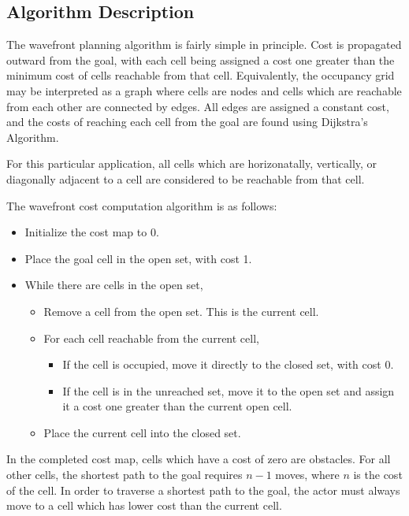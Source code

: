 \documentclass[11pt]{article} %
\begin{document}
\subsection{Algorithm Description}
The wavefront planning algorithm is fairly simple in principle.  Cost is propagated outward from the goal, with each cell being assigned a cost one greater than the minimum cost of cells reachable from that cell.  Equivalently, the occupancy grid may be interpreted as a graph where cells are nodes and cells which are reachable from each other are connected by edges.  All edges are assigned a constant cost, and the costs of reaching each cell from the goal are found using Dijkstra's Algorithm.

For this particular application, all cells which are horizonatally, vertically, or diagonally adjacent to a cell are considered to be reachable from that cell.

The wavefront cost computation algorithm is as follows:

\begin{itemize}
 \item Initialize the cost map to 0.
 \item Place the goal cell in the open set, with cost 1.
 \item While there are cells in the open set, \begin{itemize}
  \item Remove a cell from the open set.  This is the current cell.
  \item For each cell reachable from the current cell, \begin{itemize}
    \item If the cell is occupied, move it directly to the closed set, with cost 0.
    \item If the cell is in the unreached set, move it to the open set and assign it a cost one greater than the current open cell.
  \end{itemize}
  \item Place the current cell into the closed set.
 \end{itemize}
\end{itemize}

In the completed cost map, cells which have a cost of zero are obstacles.  For all other cells, the shortest path to the goal requires $n-1$ moves, where $n$ is the cost of the cell.  In order to traverse a shortest path to the goal, the actor must always move to a cell which has lower cost than the current cell.
\end{document}
